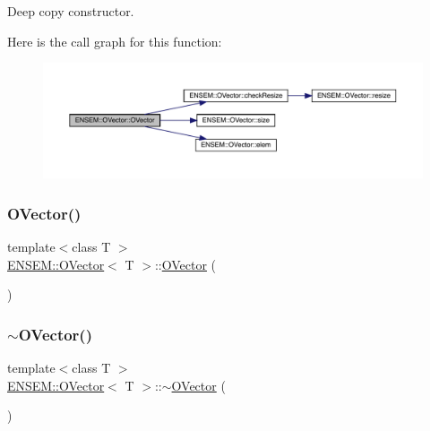Deep copy constructor. 

Here is the call graph for this function\+:
\nopagebreak
\begin{figure}[H]
\begin{center}
\leavevmode
\includegraphics[width=350pt]{d0/d8d/classENSEM_1_1OVector_a10129359c78668211e551f3b13829208_cgraph}
\end{center}
\end{figure}
\mbox{\label{classENSEM_1_1OVector_a49c6719652aea7b411f9ce1e5aa38b18}} 
\subsubsection{\texorpdfstring{OVector()}{OVector()}\hspace{0.1cm}{\footnotesize\ttfamily [4/6]}}
{\footnotesize\ttfamily template$<$class T $>$ \\
\mbox{\hyperlink{classENSEM_1_1OVector}{E\+N\+S\+E\+M\+::\+O\+Vector}}$<$ T $>$\+::\mbox{\hyperlink{classENSEM_1_1OVector}{O\+Vector}} (\begin{DoxyParamCaption}{ }\end{DoxyParamCaption})\hspace{0.3cm}{\ttfamily [inline]}}

\mbox{\label{classENSEM_1_1OVector_adce03257e8042e3ba68c15f88148a83a}} 
\subsubsection{\texorpdfstring{$\sim$OVector()}{~OVector()}\hspace{0.1cm}{\footnotesize\ttfamily [2/2]}}
{\footnotesize\ttfamily template$<$class T $>$ \\
\mbox{\hyperlink{classENSEM_1_1OVector}{E\+N\+S\+E\+M\+::\+O\+Vector}}$<$ T $>$\+::$\sim$\mbox{\hyperlink{classENSEM_1_1OVector}{O\+Vector}} (\begin{DoxyParamCaption}{ }\end{DoxyParamCaption})\hspace{0.3cm}{\ttfamily [inline]}}

